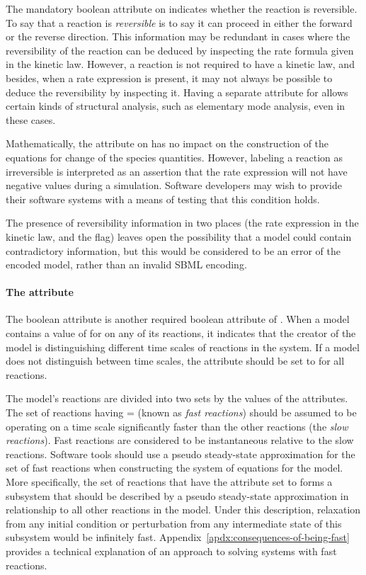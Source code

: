 The mandatory boolean attribute  on \Reaction
indicates whether the reaction is reversible.  To say that a
reaction is \emph{reversible} is to say it can proceed in either
the forward or the reverse direction.  This information may be
redundant in cases where the reversibility of the reaction can be
deduced by inspecting the rate formula given in the kinetic law.
However, a reaction is not required to have a kinetic law, and
besides, when a rate expression is present, it may not always be
possible to deduce the reversibility by inspecting it.  Having a
separate attribute for  allows certain kinds of
structural analysis, such as elementary mode analysis, even in
these cases.

Mathematically, the  attribute on \Reaction has
no impact on the construction of the equations for change of the
species quantities.  However, labeling a reaction as irreversible
is interpreted as an assertion that the rate expression will not
have negative values during a simulation.  Software developers may
wish to provide their software systems with a means of testing
that this condition holds.

The presence of reversibility information in two places (\ie the
rate expression in the kinetic law, and the 
flag) leaves open the possibility that a model could contain
contradictory information, but this would be considered to be an
error of the encoded model, rather than an invalid SBML encoding.


\paragraph{The  attribute}
\label{sec:fast}

The boolean attribute  is another required boolean
attribute of \Reaction.  When a model contains a value of
 for  on any of its reactions, it indicates
that the creator of the model is distinguishing different time
scales of reactions in the system.  If a model does not
distinguish between time scales, the  attribute should
be set to  for all reactions.

The model's reactions are divided into two sets by the
values of the  attributes.  The set of reactions
having = (known as \emph{fast reactions})
should be assumed to be operating on a time scale significantly
faster than the other reactions (the \emph{slow reactions}).  Fast
reactions are considered to be instantaneous relative to the slow
reactions.  Software tools should use a pseudo steady-state
approximation for the set of fast reactions when constructing the
system of equations for the model.  More specifically, the set of
reactions that have the  attribute set to 
forms a subsystem that should be described by a pseudo
steady-state approximation in relationship to all other reactions
in the model.  Under this description, relaxation from any initial
condition or perturbation from any intermediate state of this
subsystem would be infinitely fast.
Appendix~\ref{apdx:consequences-of-being-fast} provides a
technical explanation of an approach to solving systems with fast
reactions.

